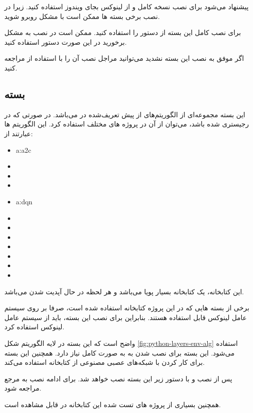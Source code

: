 \begin{note}
پیشنهاد می‌شود برای نصب نسخه کامل  و  از لینوکس بجای ویندوز استفاده کنید. زیرا در نصب برخی بسته ها ممکن است با مشکل روبرو شوید.
\end{note}

برای نصب کامل این بسته از دستور  را استفاده کنید. ممکن است در نصب  به مشکل برخورید در این صورت دستور  استفاده کنید.

اگر موفق به نصب این بسته نشدید می‌توانید مراجل نصب آن را با استفاده از 
\cite{medgyminstall}
مراجعه کنید.


\subsection{بسته }
این بسته مجموعه‌ای از الگوریتم‌های از پیش تعریف‌شده در  می‌باشد. در صورتی که  در  رجیستری شده باشد، می‌توان از آن در پروژه های مختلف استفاده کرد. این الگوریتم ها عبارتند از:

\begin{multicols}{3}
\begin{itemize}
\item \gls{a:a2c}
\item {}
\item {}
\item {}
\item \gls{a:dqn}
\item {}
\item {}
\item {}
\item {}
\item {}
\item {}
\item {}
\end{itemize}
\end{multicols}

این کتابخانه، یک کتابخانه بسیار پویا می‌باشد و هر لحظه در حال آپدیت شدن می‌باشد.

\begin{remark}
	برخی از بسته هایی که در این پروژه کتابخانه استفاده شده است، صرفا بر روی سیستم عامل لینوکس قابل استفاده هستند. بنابراین برای نصب این بسته، باید از سیستم عامل لینوکس استفاده کرد.
\end{remark}

واضح است که این بسته در لایه الگوریتم شکل \ref{fig:python-layers-env-alg} استفاده می‌شود. این بسته برای نصب شدن به  به صورت کامل نیاز دارد. همچنین این بسته برای کار کردن با شبکه‌های عصبی مصنوعی از کتابخانه  استفاده می‌کند.

پس از نصب  و  با دستور زیر این بسته نصب خواهد شد.
برای ادامه نصب به مرجع  \cite{stable-baselines-doc} مراجعه شود.

همچنین بسیاری از پروژه های تست شده این کتابخانه در \cite{stable-baselines-med} قابل مشاهده است.



